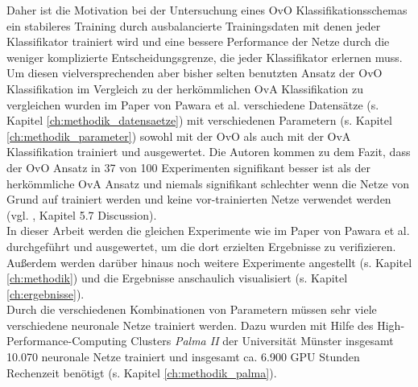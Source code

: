 Daher ist die Motivation bei der Untersuchung eines OvO Klassifikationsschemas ein stabileres Training durch ausbalancierte Trainingsdaten mit denen jeder Klassifikator trainiert wird und eine bessere Performance der Netze durch die weniger komplizierte  Entscheidungsgrenze, die jeder Klassifikator erlernen muss.\\

Um diesen vielversprechenden aber bisher selten benutzten Ansatz der OvO Klassifikation im Vergleich zu der herkömmlichen OvA Klassifikation zu vergleichen wurden im Paper von Pawara et al. \cite{pawaraPaper} verschiedene Datensätze (s. Kapitel \ref{ch:methodik_datensaetze}) mit verschiedenen Parametern (s. Kapitel \ref{ch:methodik_parameter}) sowohl mit der OvO als auch mit der OvA Klassifikation trainiert und ausgewertet.
Die Autoren kommen zu dem Fazit, dass der OvO Ansatz in 37 von 100 Experimenten signifikant besser ist als der herkömmliche OvA Ansatz und niemals signifikant schlechter wenn die Netze von Grund auf trainiert werden und keine vor-trainierten Netze verwendet werden (vgl. \cite{pawaraPaper}, Kapitel 5.7 Discussion).\\

In dieser Arbeit werden die gleichen Experimente wie im Paper von Pawara et al. \cite{pawaraPaper} durchgeführt und ausgewertet, um die dort erzielten Ergebnisse zu verifizieren. Außerdem werden darüber hinaus noch weitere Experimente angestellt (s. Kapitel \ref{ch:methodik}) und die Ergebnisse anschaulich visualisiert (s. Kapitel \ref{ch:ergebnisse}).\\

Durch die verschiedenen Kombinationen von Parametern müssen sehr viele verschiedene neuronale Netze trainiert werden. Dazu wurden mit Hilfe des High-Performance-Computing Clusters \textit{Palma II} der Universität Münster \cite{palma2} insgesamt 10.070 neuronale Netze trainiert und insgesamt ca. 6.900 GPU Stunden Rechenzeit benötigt (s. Kapitel \ref{ch:methodik_palma}).
